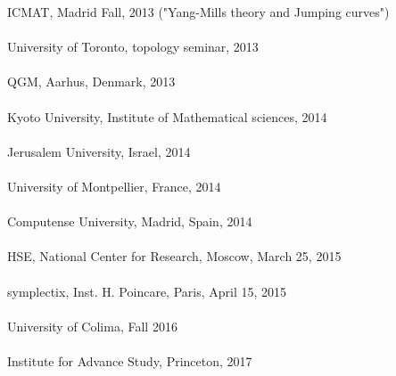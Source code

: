 \documentclass[overlapped,line,letterpaper]{res}
\begin{document}
\begin{resume}
ICMAT, Madrid Fall, 2013 ("Yang-Mills theory and Jumping curves") \\\\
University of Toronto, topology seminar, 2013 \\\\
QGM, Aarhus, Denmark, 2013 \\\\
Kyoto University, Institute of Mathematical sciences, 2014 \\\\
Jerusalem University, Israel, 2014 \\\\
University of Montpellier, France, 2014 \\\\
Computense University, Madrid, Spain, 2014\\\\
HSE, National Center for Research, Moscow, March 25, 2015 \\\\
symplectix, Inst. H. Poincare, Paris, April 15, 2015 \\\\
University of Colima, Fall 2016 \\\\
Institute for Advance Study, Princeton, 2017

\end{resume}
\end{document}
